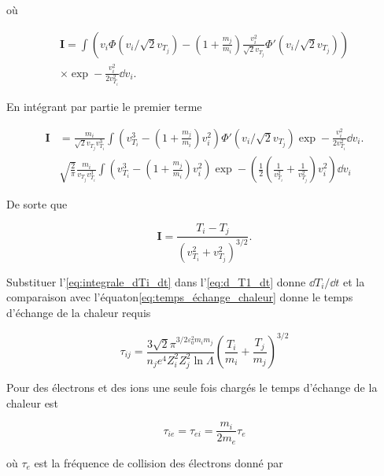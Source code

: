 \documentclass[main.tex]{subfiles}
\begin{document}
\noindent où

\begin{align*}
	\bm{I} = \int \left( v_i \Phi \left( v_i / \sqrt{2} v_{T_j} \right) - \left( 1 + \frac{m_j}{m_i} \right) \frac{v_i^2}{\sqrt{2} v_{T_j}} \Phi'\left( v_i / \sqrt{2} v_{T_j} \right) \right) \\
	\times \exp - \frac{v_i^2}{2 v_{T_i}^2} \dd v_i.
\end{align*}

En intégrant par partie le premier terme

\begin{align*}
	\bm{I}& = \frac{m_i}{\sqrt{2} v_{T_j} v_{T_i}^3} \int \left( v_{T_i}^3 - \left( 1 + \frac{m_j}{m_i} \right) v_i^2 \right) \Phi' \left( v_i / \sqrt{2} v_{T_j} \right) \exp - \frac{v_i^2}{2 v_{T_i}^2} \dd v_i.\\
	& \sqrt{\frac{2}{\pi}} \frac{m_i}{v_{T_j} v_{T_i}^3} \int \left(v_{T_i}^3 - \left( 1 + \frac{m_j}{m_i} \right) v_i^2 \right)  \exp - \left( \frac{1}{2} \left( \frac{1}{v_{T_i}^2} + \frac{1}{v_{T_j}^2} \right) v_i^2 \right) \dd v_i
\end{align*}

\noindent De sorte que

\begin{equation}
	\bm{I} = \frac{T_i - T_j}{\left( v_{T_i}^2 + v_{T_j}^2\right)^{3/2}}.
	\label{eq:integrale_dTi_dt}
\end{equation}

\noindent Substituer l'\autoref{eq:integrale_dTi_dt}
 dans l'\autoref{eq:d_T1_dt} donne \( \dd T_i / \dd t \) et la comparaison avec l'équaton\ref{eq:temps_échange_chaleur} donne le temps d'échange de la chaleur requis
 
 \begin{equation}
 	\tau_{ij} = \frac{3 \sqrt{2}\pi^{3/2 \varepsilon_0^2 m_i m_j}}{n_j e^4 Z_i^2 Z_j^2 \ln \Lambda} \left(\frac{T_i}{m_i} + \frac{T_j}{m_j} \right)^{3/2}
 	\label{eq:temps_echange_chaleur_2}
 \end{equation}

\noindent  Pour des électrons et des ions une seule fois chargés le temps d'échange de la chaleur est

\begin{equation}
	\tau_{ie} = \tau_{ei} = \frac{m_i}{2m_e} \tau_e
	\label{eq:temps_echange_chaleur_3}
\end{equation}

\noindent où \( \tau_e \) est la fréquence de collision des électrons donné par
\end{document}
